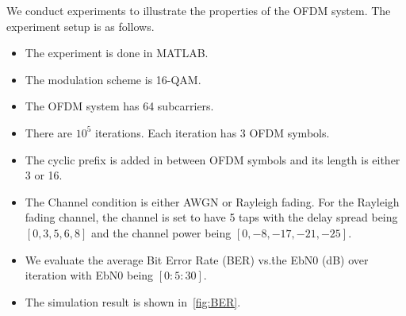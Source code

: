 We conduct experiments to illustrate the properties of the OFDM system. The experiment setup is as follows.
\begin{itemize}
    \item The experiment is done in MATLAB.
    \item The modulation scheme is 16-QAM.
    \item The OFDM system has 64 subcarriers.
    \item There are $10^5$ iterations. Each iteration has 3 OFDM symbols.
    \item The cyclic prefix is added in between OFDM symbols and its length is either 3 or 16.
    \item The Channel condition is either AWGN or Rayleigh fading. For the Rayleigh fading channel, the channel is set to have 5 taps with the delay spread being $[0, 3, 5, 6, 8]$ and the channel power being $[0, -8, -17, -21, -25]$.
    \item We evaluate the average Bit Error Rate (BER) vs.\. the EbN0 (dB) over iteration with EbN0 being $[0:5:30]$.
    \item The simulation result is shown in~\cref{fig:BER}.
\end{itemize}

